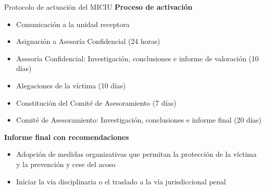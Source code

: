 \documentclass{beamer}
\begin{document}
    \begin{frame}{Protocolo de actuación del MICIU}
        \textbf{Proceso de activación}
        \begin{itemize}
            \item Comunicación a la unidad receptora
            \item Asignación a Asesoría Confidencial (24 horas)
            \item Asesoría Confidencial: Investigación, conclusiones e informe de valoración (10 días)
            \item Alegaciones de la víctima (10 días)
            \item Constitución del Comité de Asesoramiento (7 días)
            \item Comité de Asesoramiento: Investigación, conclusiones e informe final (20 días)
        \end{itemize}
        \textbf{Informe final con recomendaciones}
        \begin{itemize}
            \item Adopción de medidas organizativas que permitan la protección de la víctima y la prevención y cese del acoso
            \item Iniciar la vía disciplinaria o el traslado a la vía jurisdiccional penal
        \end{itemize}
    \end{frame}
\end{document}
